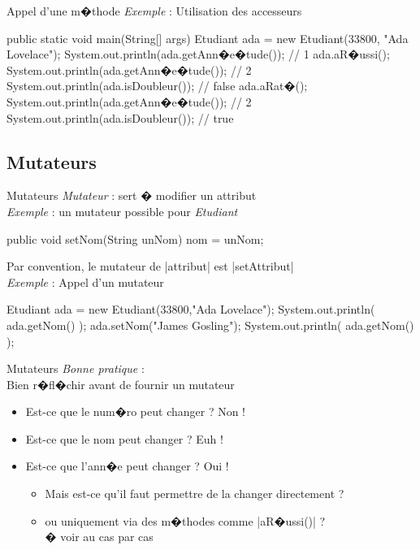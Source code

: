 \begin{frame}[fragile]{Appel d'une m�thode}
\emph{Exemple} : Utilisation des accesseurs
\begin{Java}
public static void main(String[] args) {
    Etudiant ada = new Etudiant(33800, "Ada Lovelace");
    System.out.println(ada.getAnn�e�tude()); // 1
    ada.aR�ussi();
    System.out.println(ada.getAnn�e�tude()); // 2
    System.out.println(ada.isDoubleur()); // false
    ada.aRat�();
    System.out.println(ada.getAnn�e�tude()); // 2
    System.out.println(ada.isDoubleur()); // true
}
\end{Java}
\end{frame}

\subsection{Mutateurs}

\begin{frame}[fragile]{Mutateurs}
\emph{Mutateur} : sert � modifier un attribut 
\\\bigskip
\emph{Exemple} : un mutateur possible pour \textit{Etudiant}
\begin{Java}
  public void setNom(String unNom) {nom = unNom;}
\end{Java}
\bigskip
Par convention, le mutateur de \java|attribut| est \java|setAttribut|
\\\bigskip
\emph{Exemple} : Appel d'un mutateur
\begin{Java}
  Etudiant ada = new Etudiant(33800,"Ada Lovelace");
  System.out.println( ada.getNom() );
  ada.setNom("James Gosling");
  System.out.println( ada.getNom() );
\end{Java}
\end{frame}

\begin{frame}{Mutateurs}
\emph{Bonne pratique} : 
\\Bien r�fl�chir avant de fournir un mutateur
\begin{itemize} 
\item Est-ce que le num�ro peut changer ? Non !
\item Est-ce que le nom peut changer ? Euh !
\item Est-ce que l'ann�e peut changer ? Oui ! 
  \begin{itemize} 
  \item Mais est-ce qu'il faut permettre de la changer directement ?
  \item ou uniquement via des m�thodes comme \java|aR�ussi()| ? 
  \\� voir au cas par cas
  \end{itemize}
\end{itemize}
\end{frame}

